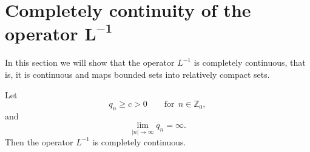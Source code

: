 \documentclass[pdftex]{sigma}
\numberwithin{equation}{section}
\begin{document}
\section[Completely continuity of the operator $L^{-1}$]{Completely continuity of the operator $\boldsymbol{L^{-1}}$}\label{section7}


In this section we will show that the operator $L^{-1}$ is completely
continuous, that is, it is continuous and maps bounded sets into relatively
compact sets.

\begin{theorem}
\label{Th7.1}Let%
\begin{equation}
q_{n}\geq c>0\qquad \text{for} \ \ n\in
\mathbb{Z}_{0},  \label{7.1}
\end{equation}%
and
\begin{equation}
\lim_{\left\vert n\right\vert \rightarrow \infty }q_{n}=\infty .  \label{7.2}
\end{equation}%
Then the operator $L^{-1}$ is completely continuous.
\end{theorem}
\end{document}
